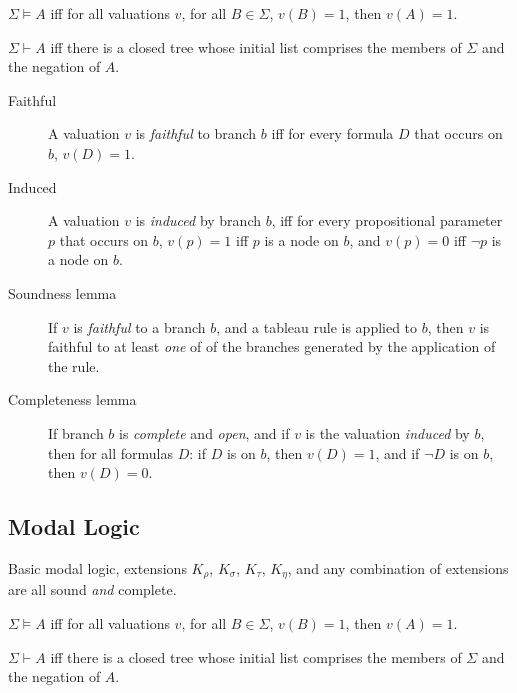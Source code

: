 \documentclass[a4paper]{article}
\begin{document}
$\Sigma \models A$ iff for all valuations $v$, for all $B \in \Sigma$, $v(B) = 1$, then $v(A) = 1$.

$\Sigma \vdash A$ iff there is a closed tree whose initial list comprises the members of $\Sigma$ and the negation of $A$.

\begin{description}
	\item[Faithful] A valuation $v$ is \emph{faithful} to branch $b$ iff for every formula $D$ that occurs on $b$, $v(D) = 1$.
	\item[Induced] A valuation $v$ is \emph{induced} by branch $b$, iff for every propositional parameter $p$ that occurs on $b$, $v(p) = 1$ iff $p$ is a node on $b$, and $v(p) = 0$ iff $\lnot p$ is a node on $b$.
	\item[Soundness lemma] If $v$ is \emph{faithful} to a branch $b$, and a tableau rule is applied to $b$, then $v$ is faithful to at least \emph{one} of of the branches generated by the application of the rule.
	\item[Completeness lemma] If branch $b$ is \emph{complete} and \emph{open}, and if $v$ is the valuation \emph{induced} by $b$, then for all formulas $D$: if $D$ is on $b$, then $v(D) = 1$, and if $\lnot D$ is on $b$, then $v(D) = 0$. 
\end{description}

\subsection{Modal Logic}

Basic modal logic, extensions $K_{\rho}$, $K_{\sigma}$, $K_{\tau}$, $K_{\eta}$, and any combination of extensions are all sound \emph{and} complete.

$\Sigma \models A$ iff for all valuations $v$, for all $B \in \Sigma$, $v(B) = 1$, then $v(A) = 1$.

$\Sigma \vdash A$ iff there is a closed tree whose initial list comprises the members of $\Sigma$ and the negation of $A$.
\end{document}
